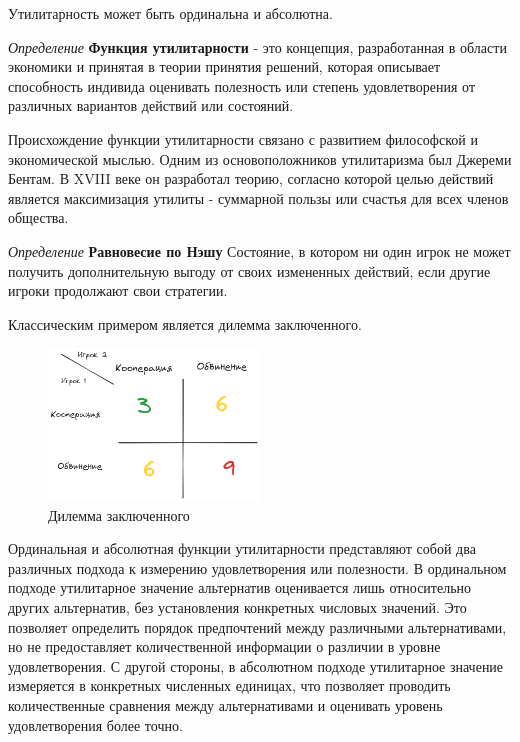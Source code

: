 Утилитарность может быть ординальна и абсолютна.

\textit{Определение} \textbf{Функция утилитарности} - это концепция, разработанная в области экономики и принятая в теории принятия решений, 
которая описывает способность индивида оценивать полезность или степень удовлетворения 
от различных вариантов действий или состояний.

Происхождение функции утилитарности связано с развитием философской и экономической мыслью. 
Одним из основоположников утилитаризма был Джереми Бентам. В XVIII веке он разработал теорию, согласно которой целью действий является максимизация утилиты -
суммарной пользы или счастья для всех членов общества.

\textit{Определение} \textbf{Равновесие по Нэшу} Состояние, в котором ни один игрок не может получить дополнительную выгоду от своих измененных действий, если другие игроки продолжают свои стратегии.

Классическим примером является дилемма заключенного.

\begin{figure}[h]
    \centering
    \includegraphics[width=0.5\textwidth]{assets/pedagogic/social/dilemma.excalidraw.png}
    \caption{Дилемма заключенного}
    \label{dilem}
\end{figure}

Ординальная и абсолютная функции утилитарности представляют собой два различных подхода к измерению удовлетворения или полезности. 
В ординальном подходе утилитарное значение альтернатив оценивается лишь относительно других альтернатив, без установления конкретных числовых значений. 
Это позволяет определить порядок предпочтений между различными альтернативами, но не предоставляет количественной информации о различии в уровне удовлетворения. 
С другой стороны, в абсолютном подходе утилитарное значение измеряется в конкретных численных единицах, что позволяет проводить количественные сравнения между альтернативами и оценивать уровень удовлетворения более точно.

